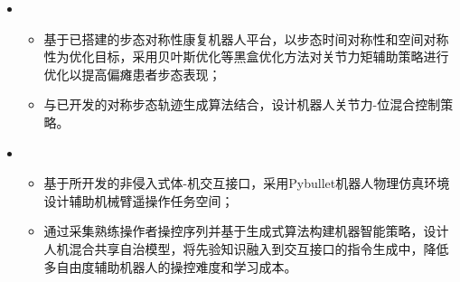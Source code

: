 \begin{itemize}[leftmargin=*]
  \item {}
  {\small
  \begin{itemize}
    \item 基于已搭建的步态对称性康复机器人平台，以步态时间对称性和空间对称性为优化目标，采用贝叶斯优化等黑盒优化方法对关节力矩辅助策略进行优化以提高偏瘫患者步态表现；
    \item 与已开发的对称步态轨迹生成算法结合，设计机器人关节力-位混合控制策略。
  \end{itemize}
  }
  \item {}
  {\small
  \begin{itemize}
    \item 基于所开发的非侵入式体-机交互接口，采用Pybullet机器人物理仿真环境设计辅助机械臂遥操作任务空间；
    \item 通过采集熟练操作者操控序列并基于生成式算法构建机器智能策略，设计人机混合共享自治模型，将先验知识融入到交互接口的指令生成中，降低多自由度辅助机器人的操控难度和学习成本。
  \end{itemize}
  }
\end{itemize}